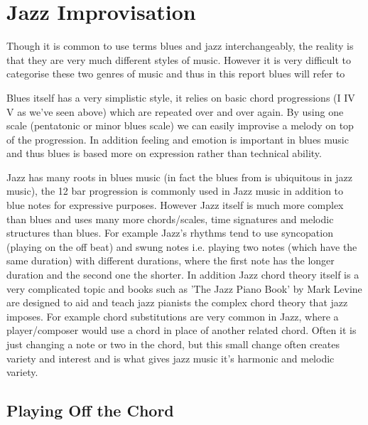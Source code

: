 \documentclass[pdftex,12pt,a4paper]{report}
\begin{document}
\section{Jazz Improvisation}
Though it is common to use terms blues and jazz interchangeably, the reality is that they are very much different styles of music. However it is very difficult to categorise these two genres of music and thus in this report blues will refer to 

Blues itself has a very simplistic style, it relies on basic chord progressions (I IV V as we've seen above) which are repeated over and over again. By using one scale (pentatonic or minor blues scale) we can easily improvise a melody on top of the progression. In addition feeling and emotion is important in blues music and thus blues is based more on expression rather than technical ability. 

Jazz has many roots in blues music (in fact the blues from is ubiquitous in jazz music), the 12 bar progression is commonly used in Jazz music in addition to blue notes for expressive purposes. However Jazz itself is much more complex than blues and uses many more chords/scales, time signatures and melodic structures than blues. For example Jazz's rhythms tend to use syncopation (playing on the off beat) and swung notes i.e. playing two notes (which have the same duration) with different durations, where the first note has the longer duration and the second one the shorter. In addition Jazz chord theory itself is a very complicated topic and books such as 'The Jazz Piano Book' by Mark Levine are designed to aid and teach jazz pianists the complex chord theory that jazz imposes. For example chord substitutions are very common in Jazz, where a player/composer would use a chord in place of another related chord. Often it is just changing a note or two in the chord, but this small change often creates variety and interest and is what gives jazz music it's harmonic and melodic variety.

\subsection{Playing Off the Chord}
\end{document}
